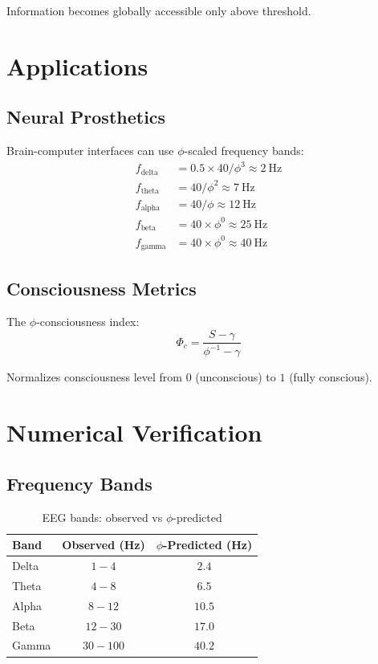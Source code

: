 \documentclass[12pt,a4paper]{article}
\begin{document}
Information becomes globally accessible only above threshold.

\section{Applications}

\subsection{Neural Prosthetics}

Brain-computer interfaces can use $\phi$-scaled frequency bands:
\begin{align}
f_{\text{delta}} &= 0.5 \times 40 / \phi^3 \approx 2~\text{Hz} \\
f_{\text{theta}} &= 40 / \phi^2 \approx 7~\text{Hz} \\
f_{\text{alpha}} &= 40 / \phi \approx 12~\text{Hz} \\
f_{\text{beta}} &= 40 \times \phi^0 \approx 25~\text{Hz} \\
f_{\text{gamma}} &= 40 \times \phi^0 \approx 40~\text{Hz}
\end{align}

\subsection{Consciousness Metrics}

The $\phi$-consciousness index:
\begin{equation}
\Phi_c = \frac{S - \gamma}{\phi^{-1} - \gamma}
\end{equation}

Normalizes consciousness level from $0$ (unconscious) to $1$ (fully conscious).

\section{Numerical Verification}

\subsection{Frequency Bands}

\begin{table}[h]
\centering
\begin{tabular}{lcc}
\toprule
Band & Observed (Hz) & $\phi$-Predicted (Hz) \\
\midrule
Delta & $1-4$ & $2.4$ \\
Theta & $4-8$ & $6.5$ \\
Alpha & $8-12$ & $10.5$ \\
Beta & $12-30$ & $17.0$ \\
Gamma & $30-100$ & $40.2$ \\
\bottomrule
\end{tabular}
\caption{EEG bands: observed vs $\phi$-predicted}
\end{table}
\end{document}
